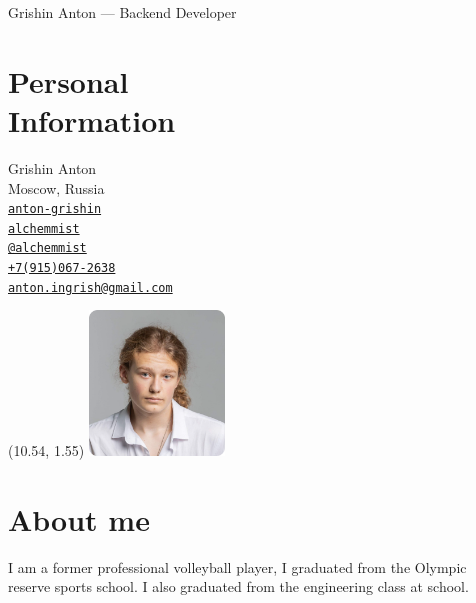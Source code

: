 \documentclass[margin,line]{resume}
\begin{document}
{\sc \large Grishin Anton --- Backend Developer} \\
\begin{resume}
  \begin{minipage}[t]{0.55\textwidth}
    \section{\mysidestyle Personal\\Information}
    Grishin Anton \\
    Moscow, Russia \\
    \faLinkedin \space
    \href{https://www.linkedin.com/in/anton-grishin-6966a8362/}{\texttt{anton-grishin}}
    \\
    \faGithub  \space
    \href{https://github.com/alchemmist/}{\texttt{alchemmist}} \\
    \faPaperPlane \space \href{https://t.me/alchemmist}{\texttt{@alchemmist}} \\
    \faPhone \space
    \href{tel:+1234567890}{\color{blue}\texttt{+7(915)067-2638}}  \\
    \faEnvelope \space
    \href{mailto:anton.ingrish@gmail.com}{\color{blue}\texttt{anton.ingrish@gmail.com}}
  \end{minipage}
  \begin{minipage}[H]{0.18\textwidth}
    \begin{textblock}{7}(10.54, 1.55)
      \includegraphics[width=0.27\textwidth]{avatar.png}
    \end{textblock}
  \end{minipage}
  \section{\mysidestyle About me}
  I am a former professional volleyball player, I graduated from the
  Olympic reserve sports school. I also graduated from the
  engineering class at school.


\end{resume}
\end{document}
